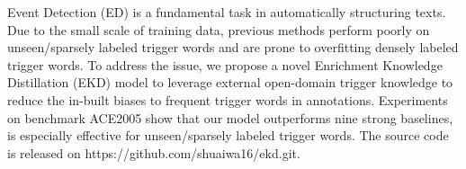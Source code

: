 Event Detection (ED) is a fundamental task in automatically structuring texts. Due to the small scale of training data, previous methods perform poorly on unseen/sparsely labeled trigger words and are prone to overfitting densely labeled trigger words. To address the issue, we propose a novel Enrichment Knowledge Distillation (EKD) model to leverage external open-domain trigger knowledge to reduce the in-built biases to frequent trigger words in annotations. Experiments on benchmark ACE2005 show that our model outperforms nine strong baselines, is especially effective for unseen/sparsely labeled trigger words. The source code is released on https://github.com/shuaiwa16/ekd.git.
